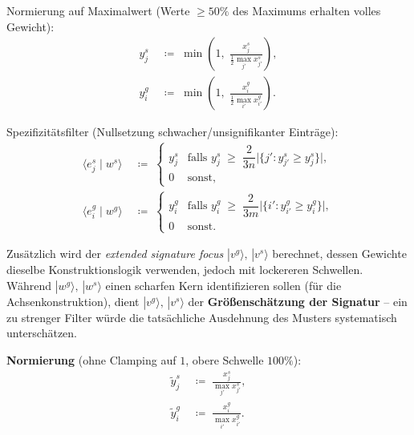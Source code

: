 Normierung auf Maximalwert (Werte $\geq 50\%$ des Maximums erhalten
volles Gewicht):
\begin{align}
    y^s_j &\;\coloneqq\; \min\!\left(1,\;
        \frac{x^s_j}{\tfrac{1}{2}\max_{j'} x^s_{j'}}\right),
    \\[4pt]
    y^g_i &\;\coloneqq\; \min\!\left(1,\;
        \frac{x^g_i}{\tfrac{1}{2}\max_{i'} x^g_{i'}}\right).
\end{align}
 
Spezifizit\"{a}tsfilter (Nullsetzung schwacher/unsignifikanter Eintr\"{a}ge):
\begin{align}
    \langle e^s_j \mid w^s \rangle
    &\;\coloneqq\;
    \begin{cases}
        y^s_j
        & \text{falls } y^s_j \;\geq\;
          \dfrac{2}{3n}\bigl|\{j' : y^s_{j'} \geq y^s_j\}\bigr|,
        \\[4pt]
        0 & \text{sonst},
    \end{cases}
    \\[8pt]
    \langle e^g_i \mid w^g \rangle
    &\;\coloneqq\;
    \begin{cases}
        y^g_i
        & \text{falls } y^g_i \;\geq\;
          \dfrac{2}{3m}\bigl|\{i' : y^g_{i'} \geq y^g_i\}\bigr|,
        \\[4pt]
        0 & \text{sonst}.
    \end{cases}
\end{align}

Zus\"{a}tzlich wird der \emph{extended signature focus}
$|v^g\rangle,\,|v^s\rangle$ berechnet, dessen Gewichte dieselbe
Konstruktionslogik verwenden, jedoch mit lockereren Schwellen.
W\"{a}hrend $|w^g\rangle,\,|w^s\rangle$ einen scharfen Kern
identifizieren sollen (f\"{u}r die Achsenkonstruktion), dient
$|v^g\rangle,\,|v^s\rangle$ der \textbf{Gr\"{o}{\ss}ensch\"{a}tzung
der Signatur} -- ein zu strenger Filter w\"{u}rde die tats\"{a}chliche
Ausdehnung des Musters systematisch untersch\"{a}tzen.

\textbf{Normierung} (ohne Clamping auf $1$, obere Schwelle $100\%$):
\begin{align}
    \tilde{y}^s_j &\;\coloneqq\;
        \frac{x^s_j}{\max_{j'} x^s_{j'}},
    \\[4pt]
    \tilde{y}^g_i &\;\coloneqq\;
        \frac{x^g_i}{\max_{i'} x^g_{i'}}.
\end{align}

